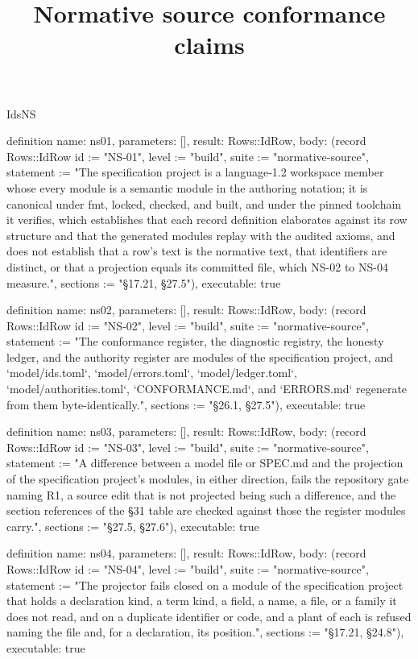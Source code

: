 \begin{lexlean}{IdsNS}
\title{Normative source conformance claims}
\begin{semanticmodule}
definition{
  name: ns01,
  parameters: [],
  result: Rows::IdRow,
  body: (record Rows::IdRow {id := "NS-01", level := "build", suite := "normative-source", statement := "The specification project is a language-1.2 workspace member whose every module is a semantic module in the authoring notation; it is canonical under fmt, locked, checked, and built, and under the pinned toolchain it verifies, which establishes that each record definition elaborates against its row structure and that the generated modules replay with the audited axioms, and does not establish that a row's text is the normative text, that identifiers are distinct, or that a projection equals its committed file, which NS-02 to NS-04 measure.", sections := "§17.21, §27.5"}),
  executable: true
}

definition{
  name: ns02,
  parameters: [],
  result: Rows::IdRow,
  body: (record Rows::IdRow {id := "NS-02", level := "build", suite := "normative-source", statement := "The conformance register, the diagnostic registry, the honesty ledger, and the authority register are modules of the specification project, and `model/ids.toml`, `model/errors.toml`, `model/ledger.toml`, `model/authorities.toml`, `CONFORMANCE.md`, and `ERRORS.md` regenerate from them byte-identically.", sections := "§26.1, §27.5"}),
  executable: true
}

definition{
  name: ns03,
  parameters: [],
  result: Rows::IdRow,
  body: (record Rows::IdRow {id := "NS-03", level := "build", suite := "normative-source", statement := "A difference between a model file or SPEC.md and the projection of the specification project's modules, in either direction, fails the repository gate naming R1, a source edit that is not projected being such a difference, and the section references of the §31 table are checked against those the register modules carry.", sections := "§27.5, §27.6"}),
  executable: true
}

definition{
  name: ns04,
  parameters: [],
  result: Rows::IdRow,
  body: (record Rows::IdRow {id := "NS-04", level := "build", suite := "normative-source", statement := "The projector fails closed on a module of the specification project that holds a declaration kind, a term kind, a field, a name, a file, or a family it does not read, and on a duplicate identifier or code, and a plant of each is refused naming the file and, for a declaration, its position.", sections := "§17.21, §24.8"}),
  executable: true
}


\end{semanticmodule}
\end{lexlean}
